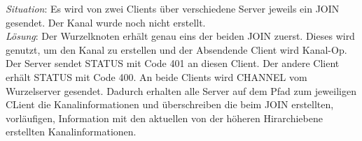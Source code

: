 \documentclass{article}
\begin{document}
\emph{Situation}: Es wird von zwei Clients über verschiedene Server jeweils ein JOIN gesendet. Der Kanal wurde noch  nicht erstellt.\\
\emph{Lösung}: Der Wurzelknoten erhält genau eins der beiden JOIN zuerst. Dieses wird genutzt, um den Kanal zu erstellen und der Absendende Client wird Kanal-Op. Der Server sendet STATUS mit Code 401 an diesen Client. Der andere Client erhält STATUS mit Code 400. An beide Clients wird CHANNEL vom Wurzelserver gesendet. Dadurch erhalten alle Server auf dem Pfad zum jeweiligen CLient die Kanalinformationen und überschreiben die beim JOIN erstellten, vorläufigen, Information mit den aktuellen von der höheren Hirarchiebene erstellten Kanalinformationen.
\end{document}
